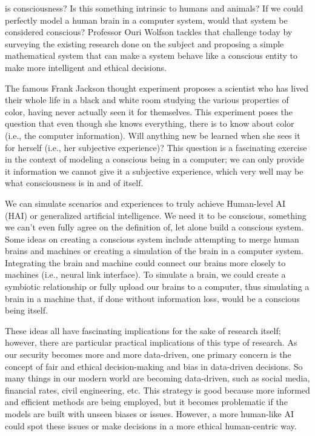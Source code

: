 \documentclass[journal,onecolumn]{IEEEtran}
\begin{document}
 is consciousness? Is this something intrinsic to humans and animals? If we could perfectly model a human brain in a computer system, would that system be considered conscious? Professor Ouri Wolfson tackles that challenge today by surveying the existing research done on the subject and proposing a simple mathematical system that can make a system behave like a conscious entity to make more intelligent and ethical decisions. 

The famous Frank Jackson thought experiment proposes a scientist who has lived their whole life in a black and white room studying the various properties of color, having never actually seen it for themselves. This experiment poses the question that even though she knows everything, there is to know about color (i.e., the computer information). Will anything new be learned when she sees it for herself (i.e., her subjective experience)? This question is a fascinating exercise in the context of modeling a conscious being in a computer; we can only provide it information we cannot give it a subjective experience, which very well may be what consciousness is in and of itself. 

We can simulate scenarios and experiences to truly achieve Human-level AI (HAI) or generalized artificial intelligence. We need it to be conscious, something we can't even fully agree on the definition of, let alone build a conscious system. Some ideas on creating a conscious system include attempting to merge human brains and machines or creating a simulation of the brain in a computer system. Integrating the brain and machine could connect our brains more closely to machines (i.e., neural link interface). To simulate a brain, we could create a symbiotic relationship or fully upload our brains to a computer, thus simulating a brain in a machine that, if done without information loss, would be a conscious being itself. 

These ideas all have fascinating implications for the sake of research itself; however, there are particular practical implications of this type of research. As our security becomes more and more data-driven, one primary concern is the concept of fair and ethical decision-making and bias in data-driven decisions. So many things in our modern world are becoming data-driven, such as social media, financial rates, civil engineering, etc. This strategy is good because more informed and efficient methods are being employed, but it becomes problematic if the models are built with unseen biases or issues. However, a more human-like AI could spot these issues or make decisions in a more ethical human-centric way. 
\end{document}
